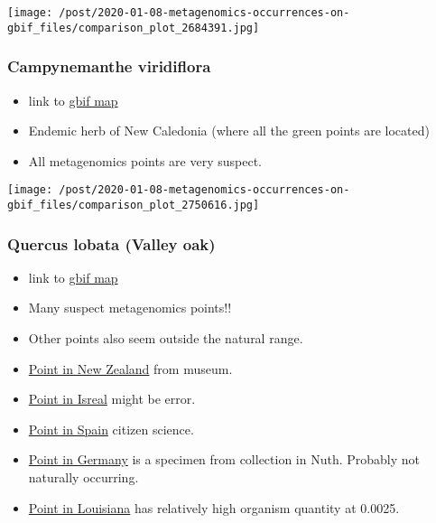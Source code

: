\documentclass[]{article}
\providecommand{\tightlist}{%
  \setlength{\itemsep}{0pt}\setlength{\parskip}{0pt}}
\begin{document}
\texttt{[image: /post/2020-01-08-metagenomics-occurrences-on-gbif\_files/comparison\_plot\_2684391.jpg]}

\hypertarget{campynemanthe-viridiflora}{%
\subsubsection{Campynemanthe
viridiflora}\label{campynemanthe-viridiflora}}

\begin{itemize}
\tightlist
\item
  link to
  \href{https://www.gbif.org/occurrence/map?taxon_key=2750616}{gbif map}
\item
  Endemic herb of New Caledonia (where all the green points are located)
\item
  All {metagenomics points} are very suspect.
\end{itemize}

\texttt{[image: /post/2020-01-08-metagenomics-occurrences-on-gbif\_files/comparison\_plot\_2750616.jpg]}

\hypertarget{quercus-lobata-valley-oak}{%
\subsubsection{Quercus lobata (Valley
oak)}\label{quercus-lobata-valley-oak}}

\begin{itemize}
\tightlist
\item
  link to
  \href{https://www.gbif.org/occurrence/map?taxon_key=2878373}{gbif map}
\item
  Many suspect {metagenomics points}!!
\item
  Other points also seem outside the natural range.
\item
  \href{https://www.gbif.org/occurrence/1091137039}{Point in New
  Zealand} from museum.\\
\item
  \href{https://www.gbif.org/occurrence/1846534143}{Point in Isreal}
  might be error.
\item
  \href{https://www.gbif.org/occurrence/2460559098}{Point in Spain}
  citizen science.
\item
  \href{https://www.gbif.org/occurrence/616369043}{Point in Germany} is
  a specimen from collection in Nuth. Probably not naturally occurring.
\item
  \href{https://www.gbif.org/occurrence/2014001054}{Point in Louisiana}
  has relatively high organism quantity at 0.0025.
\end{itemize}
\end{document}
